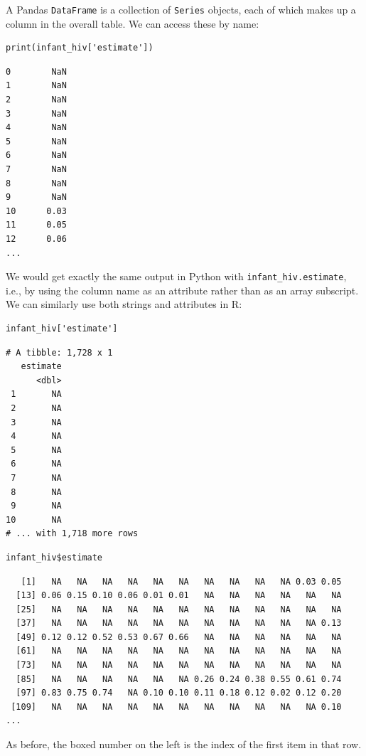 A Pandas \texttt{DataFrame} is a collection of \texttt{Series} objects,
each of which makes up a column in the overall table.
We can access these by name:

\begin{lstlisting}
print(infant_hiv['estimate'])
\end{lstlisting}

\begin{lstlisting}
0        NaN
1        NaN
2        NaN
3        NaN
4        NaN
5        NaN
6        NaN
7        NaN
8        NaN
9        NaN
10      0.03
11      0.05
12      0.06
...
\end{lstlisting}

\noindent
We would get exactly the same output in Python with \texttt{infant\_hiv.estimate},
i.e.,
by using the column name as an attribute rather than as an array subscript.
We can similarly use both strings and attributes in R:

\begin{lstlisting}
infant_hiv['estimate']
\end{lstlisting}

\begin{lstlisting}
# A tibble: 1,728 x 1
   estimate
      <dbl>
 1       NA
 2       NA
 3       NA
 4       NA
 5       NA
 6       NA
 7       NA
 8       NA
 9       NA
10       NA
# ... with 1,718 more rows
\end{lstlisting}

\begin{lstlisting}
infant_hiv$estimate
\end{lstlisting}

\begin{lstlisting}
   [1]   NA   NA   NA   NA   NA   NA   NA   NA   NA   NA 0.03 0.05
  [13] 0.06 0.15 0.10 0.06 0.01 0.01   NA   NA   NA   NA   NA   NA
  [25]   NA   NA   NA   NA   NA   NA   NA   NA   NA   NA   NA   NA
  [37]   NA   NA   NA   NA   NA   NA   NA   NA   NA   NA   NA 0.13
  [49] 0.12 0.12 0.52 0.53 0.67 0.66   NA   NA   NA   NA   NA   NA
  [61]   NA   NA   NA   NA   NA   NA   NA   NA   NA   NA   NA   NA
  [73]   NA   NA   NA   NA   NA   NA   NA   NA   NA   NA   NA   NA
  [85]   NA   NA   NA   NA   NA   NA 0.26 0.24 0.38 0.55 0.61 0.74
  [97] 0.83 0.75 0.74   NA 0.10 0.10 0.11 0.18 0.12 0.02 0.12 0.20
 [109]   NA   NA   NA   NA   NA   NA   NA   NA   NA   NA   NA 0.10
...
\end{lstlisting}

\noindent
As before,
the boxed number on the left is the index of the first item in that row.

